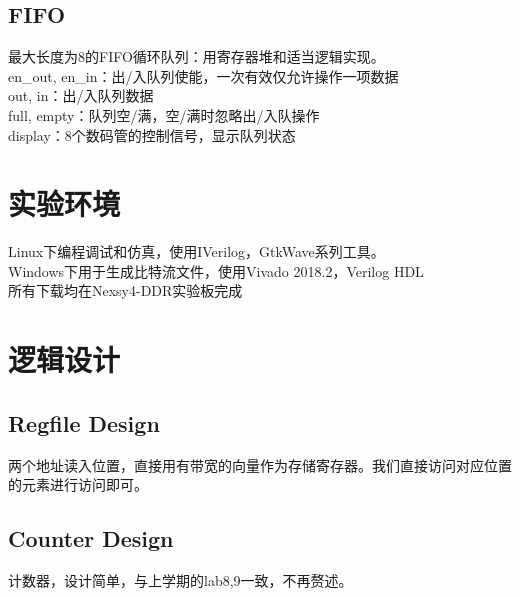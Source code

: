 \documentclass[12pt, a4paper]{article}
\begin{document}
\subsection{FIFO}
最大长度为8的FIFO循环队列：用寄存器堆和适当逻辑实现。\\
en\_out, en\_in：出/入队列使能，一次有效仅允许操作一项数据\\
out, in：出/入队列数据\\
full, empty：队列空/满，空/满时忽略出/入队操作\\
display：8个数码管的控制信号，显示队列状态

\section{实验环境}
Linux下编程调试和仿真，使用IVerilog，GtkWave系列工具。\\
Windows下用于生成比特流文件，使用Vivado 2018.2，Verilog HDL\\
所有下载均在Nexsy4-DDR实验板完成

\section{逻辑设计}
\subsection{Regfile Design}
两个地址读入位置，直接用有带宽的向量作为存储寄存器。我们直接访问对应位置的元素进行访问即可。
\subsection{Counter Design}
计数器，设计简单，与上学期的lab8,9一致，不再赘述。
\end{document}
